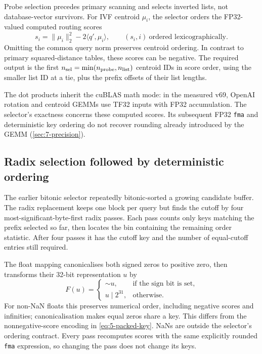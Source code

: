 Probe selection precedes primary scanning and selects inverted lists,
not database-vector survivors. For IVF centroid $\mu_i$, the selector
orders the FP32-valued computed routing scores
\begin{equation}
 s_i=\|\mu_i\|_2^2-2\langle q',\mu_i\rangle,
 \qquad (s_i,i)\ \text{ordered lexicographically}.
 \label{eq:5-probe-score}
\end{equation}
Omitting the common query norm preserves centroid ordering. In contrast
to primary squared-distance tables, these scores can be negative. The
required output is the first $n_{\rm sel}=\min(n_{\rm probe},n_{\rm list})$
centroid IDs in score order, using the smaller list ID at a tie, plus
the prefix offsets of their list lengths.

The dot products inherit the cuBLAS math mode: in the measured v69,
OpenAI rotation and centroid GEMMs use TF32 inputs with FP32 accumulation.
The selector's exactness concerns these computed scores. Its subsequent
FP32 \texttt{fma} and deterministic key ordering do not recover rounding
already introduced by the GEMM (\cref{sec:7-precision}).

\subsection{Radix selection followed by deterministic ordering}

The earlier bitonic selector repeatedly bitonic-sorted a growing candidate buffer.
The radix replacement keeps one block per query but finds the cutoff by
four most-significant-byte-first radix passes. Each pass counts only
keys matching the prefix selected so far, then locates the bin containing
the remaining order statistic. After four passes it has the cutoff key
and the number of equal-cutoff entries still required.

The float mapping canonicalises both signed zeros to positive zero,
then transforms their 32-bit representation $u$ by
\begin{equation}
 F(u)=\begin{cases}
       \mathop{\sim}u,&\text{if the sign bit is set},\\
       u\mathbin{|}2^{31},&\text{otherwise}.
      \end{cases}
 \label{eq:5-probe-key}
\end{equation}
For non-NaN floats this preserves numerical order, including negative
scores and infinities; canonicalisation makes equal zeros share a key.
This differs from the nonnegative-score encoding in
\cref{eq:5-packed-key}. NaNs are outside the selector's ordering contract.
Every pass recomputes scores with the same explicitly rounded
\texttt{fma} expression, so changing the pass does not change its keys.

